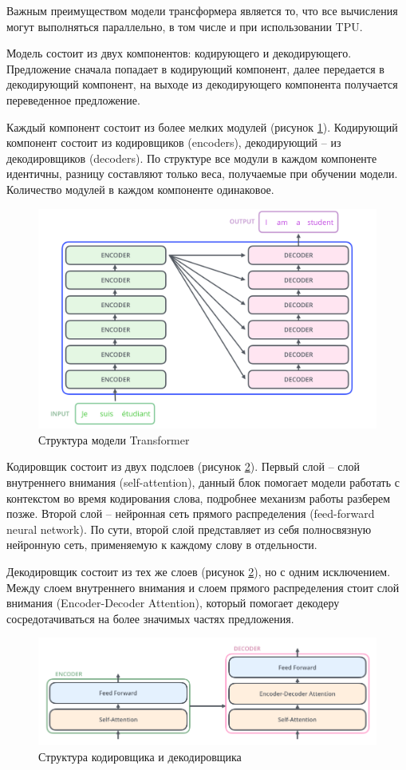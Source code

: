 \documentclass[a4paper,14pt]{article}
\begin{document}
Важным преимуществом модели трансформера является то, что все вычисления могут выполняться параллельно, в том числе и при использовании TPU.

Модель состоит из двух компонентов: кодирующего и декодирующего.
Предложение сначала попадает в кодирующий компонент, далее передается в декодирующий компонент, на выходе из декодирующего компонента получается переведенное предложение.

Каждый компонент состоит из более мелких модулей (рисунок \ref{fig:bertgroups}).
Кодирующий компонент состоит из кодировщиков (encoders), декодирующий -- из декодировщиков (decoders).
По структуре все модули в каждом компоненте идентичны, разницу составляют только веса, получаемые при обучении модели.
Количество модулей в каждом компоненте одинаковое.

\begin{figure}[H]
	\centering
	\includegraphics[width=0.6\linewidth]{image/bert_groups}
	\caption{Структура модели Transformer}
	\label{fig:bertgroups}
\end{figure}


Кодировщик состоит из двух подслоев (рисунок \ref{fig:bertencdec}).
Первый слой -- слой внутреннего внимания (self-attention), данный блок помогает модели работать с контекстом во время кодирования слова, подробнее механизм работы разберем позже.
Второй слой -- нейронная сеть прямого распределения (feed-forward neural network).
По сути, второй слой представляет из себя полносвязную нейронную сеть, применяемую к каждому слову в отдельности.

Декодировщик состоит из тех же слоев (рисунок \ref{fig:bertencdec}), но с одним исключением.
Между слоем внутреннего внимания и слоем прямого распределения стоит слой внимания (Encoder-Decoder Attention), который помогает декодеру 	сосредотачиваться на более значимых частях предложения.

\begin{figure}[H]
	\centering
	\includegraphics[width=0.8\linewidth]{image/bert_enc_dec}
	\caption{Структура кодировщика и декодировщика}
	\label{fig:bertencdec}
\end{figure}
\end{document}
